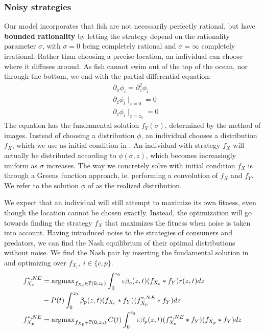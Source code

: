 \subsubsection*{Noisy strategies} %
Our model incorporates that fish are not necessarily perfectly rational, but have \textbf{bounded rationality} by letting the strategy depend on the rationality parameter $\sigma$, with $\sigma=0$ being completely rational and $\sigma = \infty$ completely irrational. Rather than choosing a precise location, an individual can choose where it diffuses around. As fish cannot swim out of the top of the ocean, nor through the bottom, we end with the partial differential equation:
\begin{align}
  \label{eq:density_PDE}
	&\partial_\sigma \phi_i = \partial_z^2 \phi_i \\
	&\partial_z \phi_i \mid_{z=0} = 0 \\
  &\partial_z \phi_i \mid_{z = z_0} = 0
\end{align}
The equation  has the fundamental solution $f_Y(\sigma)$, determined by the method of images. Instead of choosing a distribution $\phi$, an individual chooses a distribution $f_X$, which we use as initial condition in . An individual with strategy $f_X$ will actually be distributed according to $\phi(\sigma,z)$, which becomes increasingly uniform as $\sigma$ increases. The way we concretely solve  with initial condition $f_X$ is through a Greens function approach, ie. performing a convolution of $f_X$ and $f_Y$. We refer to the solution $\phi$ of  as the realized distribution.

We expect that an individual will still attempt to maximize its own fitness, even though the location cannot be chosen exactly. Instead, the optimization will go towards finding the strategy $f_X$ that maximizes the fitness when noise is taken into account.
Having introduced noise to the strategies of consumers and predators, we can find the Nash equilibrium of their optimal distributions without noise. We find the Nash pair by inserting the fundamental solution in  and optimizing over $f_{X_i},~i\in \{c, p\}$.
\begin{align}
	f_{X_c}^{*,NE} &=  \operatorname{argmax}_{f_{X_c} \in \mathbb{P}(0,z_0)}  \int_0^{z_0} \varepsilon \beta_c(z,t)(f_{X_c} * f_Y) r(z,t) dz \\ & -  P(t)\int_0^{z_0} \beta_p(z,t) (f_{X_c} * f_Y)(f_{X_p}^{*,NE} * f_Y) dz \\
	f_{X_p}^{*,NE} &=  \operatorname{argmax}_{f_{X_p} \in \mathbb{P}(0,z_0)}C(t) \int_0^{z_0} \varepsilon \beta_p(z,t)(f_{X_c}^{*,NE}  * f_Y)(f_{X_p}* f_Y) dz
\end{align}

